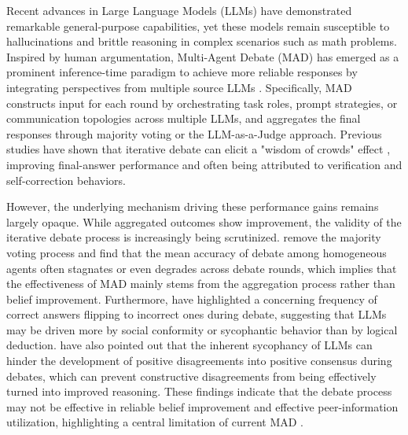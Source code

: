 \documentclass{article}
\theoremstyle{plain}
\theoremstyle{definition}
\theoremstyle{remark}
\begin{document}
Recent advances in Large Language Models (LLMs) have demonstrated remarkable general-purpose capabilities, yet these models remain susceptible to hallucinations and brittle reasoning in complex scenarios such as math problems. Inspired by human argumentation, Multi-Agent Debate (MAD) has emerged as a prominent inference-time paradigm to achieve more reliable responses by integrating perspectives from multiple source LLMs \cite{du2023improving}. Specifically, MAD constructs input for each round by orchestrating task roles, prompt strategies, or communication topologies across multiple LLMs, and aggregates the final responses through majority voting or the LLM-as-a-Judge approach. Previous studies have shown that iterative debate can elicit a "wisdom of crowds" effect \cite{minsky1986society}, improving final-answer performance and often being attributed to verification and self-correction behaviors.


However, the underlying mechanism driving these performance gains remains largely opaque. While aggregated outcomes show improvement, the validity of the iterative debate process is increasingly being scrutinized. \citet{choi2025debate} remove the majority voting process and find that the mean accuracy of debate among homogeneous agents often stagnates or even degrades across debate rounds, which implies that the effectiveness of MAD mainly stems from the aggregation process rather than belief improvement. Furthermore, \citet{wynn2025talk} have highlighted a concerning frequency of correct answers flipping to incorrect ones during debate, suggesting that LLMs may be driven more by social conformity or sycophantic behavior \cite{sharma2024sycophancy} than by logical deduction. \citet{yao2025peacemaker} have also pointed out that the inherent sycophancy of LLMs can hinder the development of positive disagreements into positive consensus during debates, which can prevent constructive disagreements from being effectively turned into improved reasoning. These findings indicate that the debate process may not be effective in reliable belief improvement and effective peer-information utilization, highlighting a central limitation of current MAD \cite{wang2024rethinking}.
\end{document}
